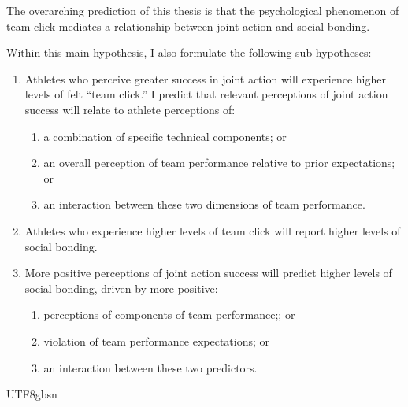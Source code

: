 \begin{CJK}{UTF8}{gbsn}
    The overarching prediction of this thesis is that the psychological phenomenon of team click mediates a relationship between joint action and social bonding.

    Within this main hypothesis, I also formulate the following sub-hypotheses:
    \begin{enumerate}
      \item Athletes who perceive greater success in joint action will experience higher levels of felt ``team click.'' I predict that relevant perceptions of joint action success will relate to athlete perceptions of:
        \begin{enumerate}
          \item a combination of specific technical components; or
          \item an overall perception of team performance relative to prior expectations; or
          \item an interaction between these two dimensions of team performance.
        \end{enumerate}
      \item Athletes who experience higher levels of team click will report higher levels of social bonding.
      \item More positive perceptions of joint action success will predict higher levels of social bonding, driven by more positive:
      \begin{enumerate}
        \item perceptions of components of team performance;; or
        \item violation of team performance expectations; or
        \item an interaction between these two predictors.
      \end{enumerate}
    \end{enumerate}








                                                  \end{CJK}{UTF8}{gbsn}
